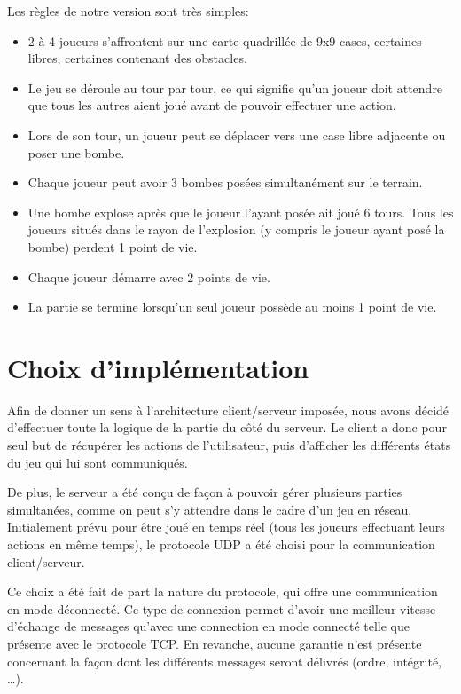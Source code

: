 Les règles de notre version sont très simples:
\begin{itemize}
	\item 2 à 4 joueurs s'affrontent sur une carte quadrillée de 9x9 cases, certaines libres, certaines contenant des obstacles.
    \item Le jeu se déroule au tour par tour, ce qui signifie qu'un joueur doit attendre que tous les autres aient joué avant de pouvoir effectuer une action.
    \item Lors de son tour, un joueur peut se déplacer vers une case libre adjacente ou poser une bombe.
    \item Chaque joueur peut avoir 3 bombes posées simultanément sur le terrain.
    \item Une bombe explose après que le joueur l'ayant posée ait joué 6 tours. Tous les joueurs situés dans le rayon de l'explosion (y compris le joueur ayant posé la bombe) perdent 1 point de vie.
    \item Chaque joueur démarre avec 2 points de vie.
    \item La partie se termine lorsqu'un seul joueur possède au moins 1 point de vie.
\end{itemize}

\section*{Choix d'implémentation}

Afin de donner un sens à l'architecture client/serveur imposée, nous avons décidé d'effectuer toute la logique de la partie du côté du serveur. Le client a donc pour seul but de récupérer les actions de l'utilisateur, puis d'afficher les différents états du jeu qui lui sont communiqués.

De plus, le serveur a été conçu de façon à pouvoir gérer plusieurs parties simultanées, comme on peut s'y attendre dans le cadre d'un jeu en réseau.\\

Initialement prévu pour être joué en temps réel (tous les joueurs effectuant leurs actions en même temps), le protocole UDP a été choisi pour la communication client/serveur.

Ce choix a été fait de part la nature du protocole, qui offre une communication en mode déconnecté. Ce type de connexion permet d'avoir une meilleur vitesse d'échange de messages qu'avec une connection en mode connecté telle que présente avec le protocole TCP. En revanche, aucune garantie n'est présente concernant la façon dont les différents messages seront délivrés (ordre, intégrité, \dots).

